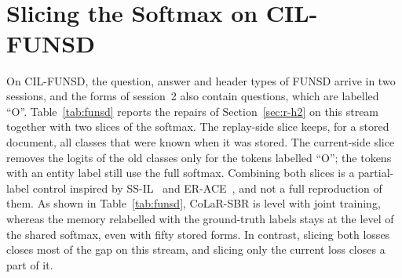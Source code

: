 \begin{table}[!htbp]
  \centering
  \caption[Retention matrices on CIL-CORD]{\textbf{Retention matrices on CIL-CORD}
  (session-restricted F1).}
  \label{tab:mat-cord}
  \footnotesize
  \\[8pt]
  \\[8pt]
  
\end{table}

\begin{table}[!htbp]
  \centering
  \caption[Retention matrices on Mixed]{\textbf{Retention matrices on Mixed}
  (session-restricted F1).}
  \label{tab:mat-mixed}
  \footnotesize
  \\[8pt]
  \\[8pt]
  
\end{table}

\section{Slicing the Softmax on CIL-FUNSD}
\label{app:funsd}

On CIL-FUNSD, the question, answer and header types of FUNSD arrive in two sessions, and
the forms of session~2 also contain questions, which are labelled ``O''.
Table~\ref{tab:funsd} reports the repairs of Section~\ref{sec:r-h2} on this stream
together with two slices of the softmax. The replay-side slice keeps, for a stored
document, all classes that were known when it was stored. The current-side slice removes
the logits of the old classes only for the tokens labelled ``O''; the tokens with an
entity label still use the full softmax. Combining both slices is a partial-label control
inspired by SS-IL~\citep{ahn2021ssil} and ER-ACE~\citep{caccia2022erace}, and not a full
reproduction of them. As shown in Table~\ref{tab:funsd}, CoLaR-SBR is level with joint
training, whereas the memory relabelled with the ground-truth labels stays at the level
of the shared softmax, even with fifty stored forms. In contrast, slicing both losses
closes most of the gap on this stream, and slicing only the current loss closes a part of
it.

\begin{table}[!htbp]
  \centering
  \caption[CIL-FUNSD]{\textbf{CIL-FUNSD} ($10$ stored forms per session; mean $\pm$ s.d.).
  $R[2,1]$: F1 of session~1 after session~2 (range over the runs). $^{r}$Uses the
  ground-truth labels of the stored forms.}
  \label{tab:funsd}
  \small
\end{table}


